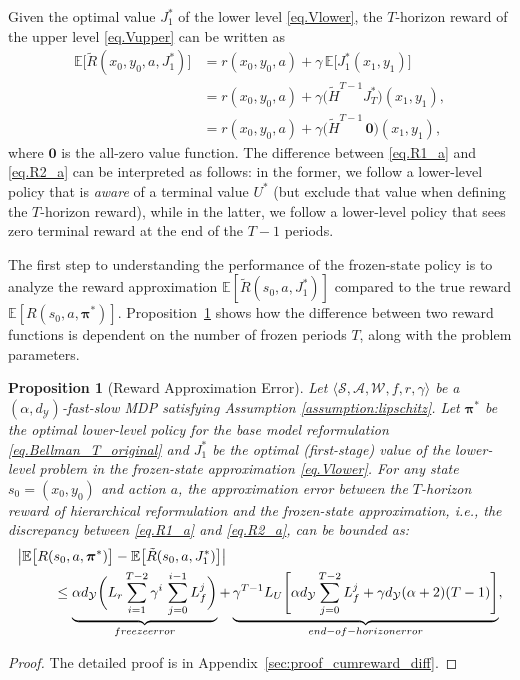 \documentclass[11pt, notitlepage]{article}
\newcommand{\E}{\mathbb{E}}
\newcommand{\1}{\mathbbm{1}}
\newtheorem{proposition}{Proposition}[section]
\begin{document}
Given the optimal value $J_1^*$ of the lower level \eqref{eq.Vlower}, the $T$-horizon reward of the upper level \eqref{eq.Vupper} can be written as
\begin{align} 
    \E \bigl [\tilde{R}(x_0, y_0 ,a,J_1^*) \bigr] &= r(x_0,y_0,a) + \gamma \, \E \bigl[J_1^*(x_1, y_1)\bigr] \nonumber\\
    &= r(x_0,y_0,a) + \gamma  \bigl (\tilde{H}^{T-1} J_T^* \bigr) (x_1,y_1), \nonumber\\ &= r(x_0,y_0,a) + \gamma  \bigl (\tilde{H}^{T-1} \, \boldsymbol{0} \bigr) (x_1,y_1),\label{eq.R2_a}
\end{align}
where $\boldsymbol{0}$ is the all-zero value function. %
The difference between \eqref{eq.R1_a} and \eqref{eq.R2_a} can be interpreted as follows: in the former, we follow a lower-level policy that is \emph{aware} of a terminal value $U^*$ (but exclude that value when defining the $T$-horizon reward), while in the latter, we follow a lower-level policy that sees zero terminal reward at the end of the $T-1$ periods.

The first step to understanding the performance of the frozen-state policy is to analyze the reward approximation $\E[\tilde{R}(s_0, a, J_1^*)]$ compared to the true reward $\E[R(s_0, a, \boldsymbol{\pi}^*)]$. Proposition~\ref{prop:cumreward_diff} shows how the difference between two reward functions is dependent on the number of frozen periods $T$, along with the problem parameters. 
\begin{proposition}[Reward Approximation Error]
    \label{prop:cumreward_diff}
    Let $\langle \mathcal{S}, \mathcal{A}, \mathcal{W}, f, r, \gamma \rangle$ be a $(\alpha, d_\mathcal{Y})$-fast-slow MDP satisfying Assumption \ref{assumption:lipschitz}. Let $\boldsymbol{\pi}^*$ be the optimal lower-level policy for the base model reformulation \eqref{eq.Bellman_T_original} and $J_1^*$ be the optimal (first-stage) value of the lower-level problem in the frozen-state approximation \eqref{eq.Vlower}. For any state $s_0=(x_0,y_0)$ and action $a$, the approximation error between the $T$-horizon reward of hierarchical reformulation and the frozen-state approximation, i.e., the discrepancy between \eqref{eq.R1_a} and \eqref{eq.R2_a}, can be bounded as:
\begin{align}
    \bigl| \E\bigl[R(&s_0, a, \boldsymbol{\pi}^*)\bigr]- \E\bigl[\tilde{R}(s_0, a, J_1^*)\bigr]\bigr|\nonumber\\
    &\leq 
    \underbrace{\alpha d_\mathcal{Y} \biggl( L_r \sum_{i=1}^{T-2} \gamma^i \, \sum_{j=0}^{i-1} L_f^j \biggr)}_{\textnormal{freeze error}} 
    + 
    \underbrace{\gamma^{T-1} L_U \Biggl[ \alpha d_\mathcal{Y} \sum_{j=0}^{T-2} L_f^j + \gamma d_\mathcal{Y} (\alpha + 2) (T-1)\Biggr]}_{\textnormal{end-of-horizon error}},
    \label{eq:R_prop}
\end{align}

\end{proposition}
\begin{proof}
The detailed proof is in Appendix~\ref{sec:proof_cumreward_diff}.
\end{proof}
\end{document}
